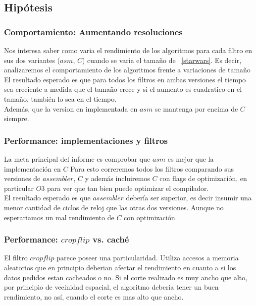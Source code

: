 \pagebreak

\subsection{Hipótesis}


\subsubsection{Comportamiento: Aumentando resoluciones}

Nos interesa saber como varia el rendimiento de los algoritmos para cada filtro en sus dos variantes ($asm$, $C$) cuando se varia el tamaño de ~\ref{starwars}. Es decir, analizaremos el comportamiento de los algoritmos frente a variaciones de tamaño\\

El resultado esperado es que para todos los filtros en ambas versiones el tiempo sea creciente a medida que el tamaño crece y si el aumento es cuadratico en el tamaño, también lo sea en el tiempo. \\
Además, que la version en implementada en $asm$ se mantenga por encima de $C$ siempre. \\ 



\subsubsection{Performance: implementaciones y filtros}

La meta principal del informe es comprobar que $asm$ es mejor que la implementación en $C$
Para esto correremos todos los filtros comparando sus versiones de $assembler$, $C$ y además incluiremos $C$ con flags de optimización, en particular $O3$ para ver que tan bien puede optimizar el compilador. \\

El resultado esperado es que $assembler$ debería ser superior, es decir insumir una menor cantidad de ciclos de reloj que las otras dos versiones. Aunque no esperariamos un mal rendimiento de $C$ con optimización. \\



\subsubsection{Performance: $cropflip$ vs. caché}

El filtro $cropflip$ parece poseer una particularidad. Utiliza accesos a memoria aleatorios que en principio deberian afectar el rendimiento en cuanto a si los datos pedidos estan cacheados o no. 
Si el corte realizado es muy ancho que alto, por principio de vecinidad espacial, el algoritmo debería tener un buen rendimiento, no así, cuando el corte es mas alto que ancho. \\

